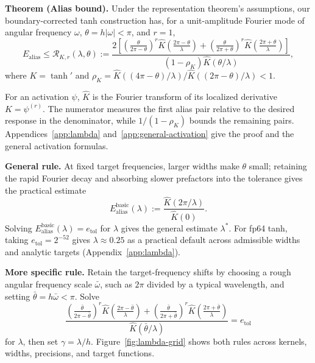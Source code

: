 \documentclass[11pt]{article}
\begin{document}
\noindent\textbf{Theorem (Alias bound).}
Under the representation theorem's assumptions, our boundary-corrected tanh
construction has, for a unit-amplitude Fourier mode of angular frequency
\(\omega\), \(\theta=h|\omega|<\pi\), and \(r=1\),
\begin{equation}
E_{\mathrm{alias}}\le\mathcal R_{K,r}(\lambda,\theta):=
\frac{2\left[
\left(\frac{\theta}{2\pi-\theta}\right)^r\widehat K\!\left(\frac{2\pi-\theta}{\lambda}\right)
+\left(\frac{\theta}{2\pi+\theta}\right)^r\widehat K\!\left(\frac{2\pi+\theta}{\lambda}\right)
\right]}{(1-\rho_K)\widehat K(\theta/\lambda)},
\label{eq:compact-replica}
\end{equation}
where \(K=\tanh'\) and
\(\rho_K=\widehat K((4\pi-\theta)/\lambda)/\widehat K((2\pi-\theta)/\lambda)<1\).

For an activation \(\psi\), \(\widehat K\) is the Fourier transform of its
localized derivative \(K=\psi^{(r)}\). The numerator measures the first alias
pair relative to the desired response in the denominator, while
\(1/(1-\rho_K)\) bounds the remaining pairs.
Appendices~\ref{app:lambda} and~\ref{app:general-activation} give the proof
and the general activation formulas.

\textbf{General rule.} At fixed target frequencies, larger widths make
\(\theta\) small; retaining the rapid Fourier decay and absorbing slower
prefactors into the tolerance gives the practical estimate
\begin{equation}
E_{\mathrm{alias}}^{\mathrm{basic}}(\lambda):=
\frac{\widehat K(2\pi/\lambda)}{\widehat K(0)}.
\label{eq:lambda-basic-rule}
\end{equation}
Solving \(E_{\mathrm{alias}}^{\mathrm{basic}}(\lambda)=e_{\mathrm{tol}}\) for
\(\lambda\) gives the general estimate \(\lambda^*\). For fp64 tanh, taking
\(e_{\mathrm{tol}}=2^{-52}\) gives \(\lambda\approx0.25\) as a practical
default across admissible widths and analytic targets
(Appendix~\ref{app:lambda}).

\textbf{More specific rule.} Retain the target-frequency shifts by choosing a
rough angular frequency scale \(\bar\omega\), such as \(2\pi\) divided by a
typical wavelength, and setting \(\bar\theta=h\bar\omega<\pi\). Solve
\begin{equation}
\frac{
\left(\frac{\bar\theta}{2\pi-\bar\theta}\right)^r
\widehat K\!\left(\frac{2\pi-\bar\theta}{\lambda}\right)
+\left(\frac{\bar\theta}{2\pi+\bar\theta}\right)^r
\widehat K\!\left(\frac{2\pi+\bar\theta}{\lambda}\right)}
{\widehat K(\bar\theta/\lambda)}=e_{\mathrm{tol}}
\label{eq:lambda-refined-rule}
\end{equation}
for \(\lambda\), then set \(\gamma=\lambda/h\). Figure~\ref{fig:lambda-grid}
shows both rules across kernels, widths, precisions, and target functions.
\end{document}
